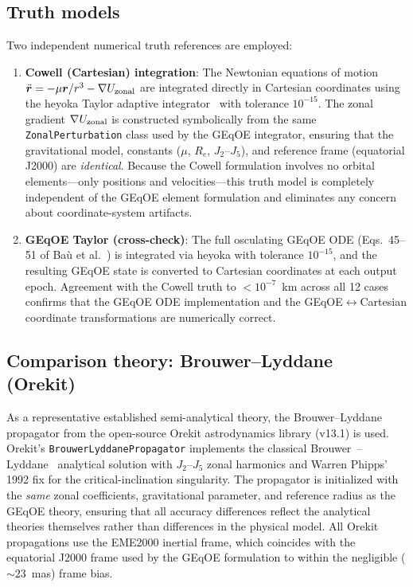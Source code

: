 \documentclass[11pt]{article}
\begin{document}
\subsection{Truth models}

Two independent numerical truth references are employed:
\begin{enumerate}
\item \textbf{Cowell (Cartesian) integration}: The Newtonian equations of
motion $\ddot{\bm{r}} = -\mu\bm{r}/r^3 - \nabla U_{\rm zonal}$ are
integrated directly in Cartesian coordinates using the heyoka Taylor adaptive
integrator~\cite{biscani2021} with tolerance $10^{-15}$. The zonal gradient
$\nabla U_{\rm zonal}$ is constructed symbolically from the same
\texttt{ZonalPerturbation} class used by the GEqOE integrator, ensuring that
the gravitational model, constants ($\mu$, $R_e$, $J_2$--$J_5$), and
reference frame (equatorial J2000) are \emph{identical}. Because the Cowell
formulation involves no orbital elements---only positions and
velocities---this truth model is completely independent of the GEqOE element
formulation and eliminates any concern about coordinate-system artifacts.
\item \textbf{GEqOE Taylor (cross-check)}: The full osculating GEqOE ODE
(Eqs.~45--51 of Ba\`u et al.~\cite{bau2021}) is integrated via heyoka with
tolerance $10^{-15}$, and the resulting GEqOE state is converted to Cartesian
coordinates at each output epoch. Agreement with the Cowell truth to
$< 10^{-7}$~km across all 12 cases confirms that the GEqOE ODE
implementation and the GEqOE$\leftrightarrow$Cartesian coordinate
transformations are numerically correct.
\end{enumerate}

\subsection{Comparison theory: Brouwer--Lyddane (Orekit)}

As a representative established semi-analytical theory, the Brouwer--Lyddane
propagator from the open-source Orekit astrodynamics library (v13.1) is used.
Orekit's \texttt{BrouwerLyddanePropagator} implements the classical
Brouwer~\cite{brouwer1959}--Lyddane~\cite{lyddane1963} analytical solution
with $J_2$--$J_5$ zonal harmonics and Warren Phipps' 1992 fix for the
critical-inclination singularity. The propagator is initialized with the
\emph{same} zonal coefficients, gravitational parameter, and reference radius
as the GEqOE theory, ensuring that all accuracy differences reflect the
analytical theories themselves rather than differences in the physical model.
All Orekit propagations use the EME2000 inertial frame, which coincides with
the equatorial J2000 frame used by the GEqOE formulation to within the
negligible ($\sim\!23$~mas) frame bias.
\end{document}
